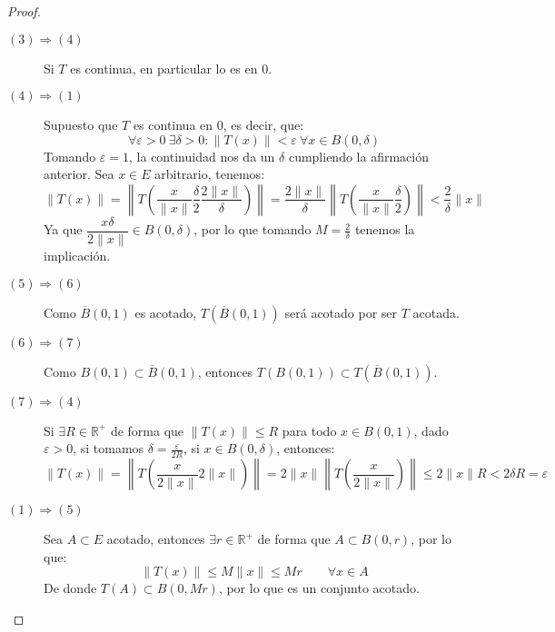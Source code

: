 \begin{prop}
\begin{proof}
\begin{description}
            \item [$(3)\Longrightarrow (4)$] Si $T$ es continua, en particular lo es en $0$.
            \item [$(4)\Longrightarrow (1)$] Supuesto que $T$ es continua en $0$, es decir, que:
                \begin{equation*}
                    \forall \varepsilon>0~\exists \delta>0 : \|T(x)\| < \varepsilon~\forall x\in B(0,\delta)
                \end{equation*}
                Tomando $\varepsilon=1$, la continuidad nos da un $\delta$ cumpliendo la afirmación anterior. Sea $x\in E$ arbitrario, tenemos:
                \begin{equation*}
                    \|T(x)\| = \left\|T\left(\dfrac{x}{\|x\|}\dfrac{\delta}{2}\dfrac{2\|x\|}{\delta}\right)\right\| = \dfrac{2\|x\|}{\delta} \left\|T\left(\dfrac{x}{\|x\|}\dfrac{\delta}{2}\right)\right\| < \dfrac{2}{\delta} \|x\|
                \end{equation*}
                Ya que $\dfrac{x\delta}{2\|x\|}\in B(0,\delta)$, por lo que tomando $M=\frac{2}{\delta}$ tenemos la implicación.
            \item [$(5)\Longrightarrow (6)$] Como $\overline{B}(0,1)$ es acotado, $T(\overline{B}(0,1))$ será acotado por ser $T$ acotada.
            \item [$(6)\Longrightarrow (7)$] Como $B(0,1)\subset \overline{B}(0,1)$, entonces $T(B(0,1))\subset T(\overline{B}(0,1))$.
            \item [$(7)\Longrightarrow (4)$] Si $\exists R\in \mathbb{R}^+$ de forma que $\|T(x)\| \leq R$ para todo $x\in B(0,1)$, dado $\varepsilon>0$, si tomamos $\delta = \frac{\varepsilon}{2R}$, si $x\in B(0,\delta)$, entonces:
                \begin{equation*}
                    \|T(x)\| = \left\|T\left(\dfrac{x}{2\|x\|}2\|x\|\right)\right\| = 2\|x\|\left\|T\left(\dfrac{x}{2\|x\|}\right)\right\| \leq 2\|x\|R < 2\delta R = \varepsilon
                \end{equation*}
            \item [$(1)\Longrightarrow (5)$] Sea $A\subset E$ acotado, entonces $\exists r\in \mathbb{R}^+$ de forma que $A\subset B(0,r)$, por lo que:
                \begin{equation*}
                    \|T(x)\| \leq M\|x\| \leq Mr \qquad \forall x\in A
                \end{equation*}
                De donde $T(A)\subset B(0,Mr)$, por lo que es un conjunto acotado.
        \end{description}
    \end{proof}
\end{prop}

